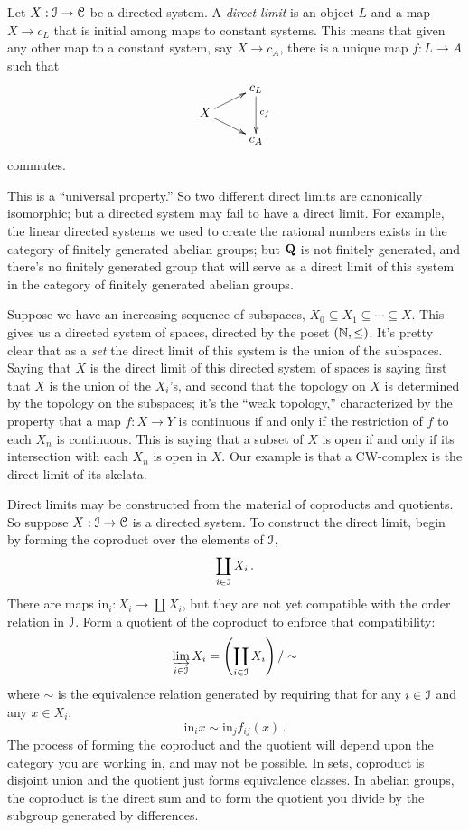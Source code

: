 \begin{definition}
Let $X:\mathcal I\to\mathcal C$ be a directed system.
A {\em direct limit} is an object $L$ and a map $X\to c_L$ that is initial among maps to constant systems. This means that given any other map to a constant system, say $X\to c_A$, there is a unique map $f:L\to A$ such that 
\[
\xymatrix@R=8pt{
& c_L \ar[dd]^{c_f} \\
X \ar[ur] \ar[dr] \\
& c_A
}\]
commutes.
\end{definition}
This is a ``universal property.'' So two different direct limits are canonically isomorphic; but a directed system may fail to have a direct limit. For example, the linear directed systems we used to create the rational numbers exists in the category of finitely generated abelian groups; but $\mathbf Q$ is not finitely generated, and there's no finitely generated group that will serve as a direct limit of this system in the category of finitely generated abelian groups. 
\begin{example}
Suppose we have an increasing sequence of subspaces, 
$X_0\subseteq X_1\subseteq\cdots\subseteq X$. This gives us a directed system
of spaces, directed by the poset $(\mathbb N,\leq)$. It's pretty clear that as a 
{\em set} the direct limit of this system is the union of the subspaces. 
Saying that $X$ is the direct limit of this directed system of spaces is 
saying first that $X$ is the union of the $X_i$'s, and second 
that the topology on $X$ is determined
by the topology on the subspaces; it's the ``weak topology,'' characterized
by the property that a map $f:X\to Y$ is continuous if and only if the 
restriction of $f$ to each $X_n$ is continuous. This is saying that a subset 
of $X$ is open if and only if its intersection with each $X_n$ is open in $X$.
Our example is that a CW-complex is the direct limit of its skelata. 
\end{example}
Direct limits may be constructed from the material of coproducts and quotients. So suppose $X:\mathcal I\to\mathcal C$ is a directed system. To construct the direct limit, begin by forming the coproduct over the elements of $\mathcal I$,
\[
\coprod_{i\in\mathcal I}X_i\,.
\]
There are maps $\mathrm{in}_i:X_i\to\coprod X_i$, but they are not yet compatible with the order relation in $\mathcal I$. Form a quotient of the coproduct to enforce that compatibility: 
\[
\varinjlim_{i\in\mathcal I}X_i=\left(\coprod_{i\in\mathcal I}X_i\right)/\sim
\]
where $\sim$ is the equivalence relation generated by requiring that 
for any $i\in\mathcal I$ and any $x\in X_i$, 
\[
\mathrm{in}_ix\sim\mathrm{in}_j f_{ij}(x)\,.
\]
The process of forming the coproduct and the quotient will depend upon the 
category you are working in, and may not be possible. 
In sets, coproduct is disjoint union and the
quotient just forms equivalence classes. In abelian groups, the coproduct
is the direct sum and to form the quotient you divide by the subgroup 
generated by differences. 

